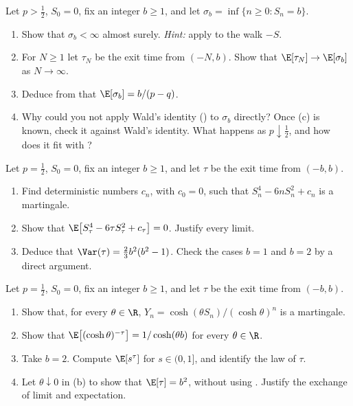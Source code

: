 \begin{exercise}\label{ex:mg-target}
\medium Let $p>\frac12$, $S_0=0$, fix an integer $b\ge1$, and let
$\sigma_b=\inf\{n\ge0:S_n=b\}$.
\begin{enumerate}[label=(\alph*)]
  \item Show that $\sigma_b<\infty$ almost surely. \emph{Hint:} apply
     to the walk $-S$.
  \item For $N\ge1$ let $\tau_N$ be the exit time from $(-N,b)$. Show that
    $\E[\tau_N]\to\E[\sigma_b]$ as $N\to\infty$.
  \item Deduce from  that $\E[\sigma_b]=b/(p-q)$.
  \item Why could you not apply Wald's identity () to $\sigma_b$
    directly? Once (c) is known, check it against Wald's identity. What happens as
    $p\downarrow\frac12$, and how does it fit with ?
\end{enumerate}
\end{exercise}

\begin{exercise}\label{ex:mg-variance}
\medium Let $p=\frac12$, $S_0=0$, fix an integer $b\ge1$, and let $\tau$ be the exit time from
$(-b,b)$.
\begin{enumerate}[label=(\alph*)]
  \item Find deterministic numbers $c_n$, with $c_0=0$, such that $S_n^4-6nS_n^2+c_n$ is a
    martingale.
  \item Show that $\E\big[S_\tau^4-6\tau S_\tau^2+c_\tau\big]=0$. Justify every limit.
  \item Deduce that $\Var(\tau)=\frac23b^2(b^2-1)$. Check the cases $b=1$ and $b=2$ by a
    direct argument.
\end{enumerate}
\end{exercise}

\begin{exercise}\label{ex:mg-laplace}
\hard Let $p=\frac12$, $S_0=0$, fix an integer $b\ge1$, and let $\tau$ be the exit time from
$(-b,b)$.
\begin{enumerate}[label=(\alph*)]
  \item Show that, for every $\theta\in\R$, $Y_n=\cosh(\theta S_n)/(\cosh\theta)^n$ is a
    martingale.
  \item Show that $\E\big[(\cosh\theta)^{-\tau}\big]=1/\cosh(\theta b)$ for every $\theta\in\R$.
  \item Take $b=2$. Compute $\E[s^\tau]$ for $s\in(0,1]$, and identify the law of $\tau$.
  \item Let $\theta\downarrow0$ in (b) to show that $\E[\tau]=b^2$, without using
    . Justify the exchange of limit and expectation.
\end{enumerate}
\end{exercise}

